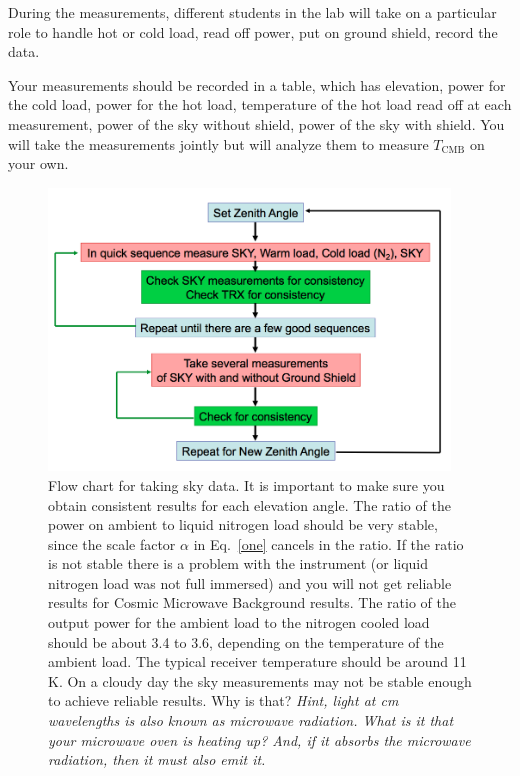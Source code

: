 During the measurements, different students in the lab will take on a particular role to handle hot or cold load, read off power, put on ground shield, record the data.
\begin{steps}
	\item\label{cmb:step:table} Your measurements should be recorded in a table, which has elevation, power for the cold load, power for the hot load, temperature of the hot load read off at each measurement, power of the sky without shield, power of the sky with shield. You will take the measurements jointly but will analyze them to measure $T_\textrm{CMB}$ on your own.
\end{steps}




\begin{figure}
	\begin{center}
		\includegraphics[trim=0pt 0pt 0pt 0pt,width=0.95\textwidth]{cmb/cmb-lab-flow-chart.png}
		\caption{Flow chart for taking sky data. It is important to make sure you obtain consistent results for each elevation angle. The ratio of the power on ambient to liquid nitrogen load should be very stable, since the scale factor $\alpha$ in Eq.~\ref{one} cancels in the ratio.  If the ratio is not stable there is a problem with the instrument (or liquid nitrogen load was not full immersed) and you will not get reliable results for Cosmic Microwave Background results.  The ratio of the output power for the ambient load to the nitrogen cooled load should be about 3.4 to 3.6, depending on the temperature of the ambient load. The typical receiver temperature should be around 11 K.  On a cloudy day the sky measurements may not be stable enough to achieve reliable results.  Why is that? \textit{Hint, light at cm wavelengths is also known as microwave radiation.  What is it that your microwave oven is heating up? And, if it absorbs the microwave radiation, then it must also emit it.}}
		\label{fig:flow-chart}
	\end{center}
\end{figure}

